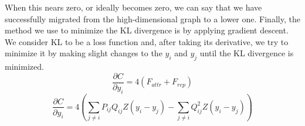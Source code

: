 When this nears zero, or ideally becomes zero, we can say that we have successfully migrated from the 
high-dimensional graph to a lower one. Finally, the method we use to minimize the KL divergence is by
applying gradient descent. We consider KL to be a loss function and, after taking its derivative, we
try to minimize it by making slight changes to the $y_i$ and $y_j$ until the KL divergence is minimized.
$$\frac{\partial C}{\partial y_i} = 4(F_{attr} + F_{rep})$$
$$\frac{\partial C}{\partial y_i} = 4\left(\sum_{j \neq i} P_{ij} Q_{ij} Z(y_i - y_j) - \sum_{j \neq i} Q_{ij}^2 Z(y_i - y_j)\right)$$
\cite{accelerating_tsne} %
